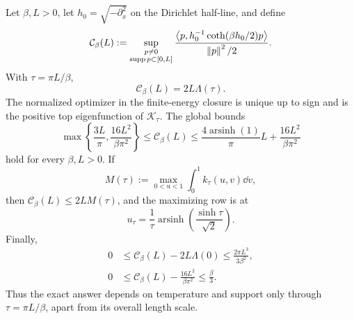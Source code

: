 \begin{theorem}
\label{thm:thermal-half-line}
Let $\beta,L>0$, let $h_0=\sqrt{-\partial_x^2}$ on the Dirichlet half-line,
and define
\begin{equation}
 \mathcal C_\beta(L)
 :=\sup_{\substack{p\neq0\\\operatorname{supp} p\subset[0,L]}}
 \frac{\left\langle p,h_0^{-1}\coth(\beta h_0/2)p\right\rangle}{\left\lVert p\right\rVert^2/2}.
 \label{eq:general-cost-definition}
\end{equation}
With $\tau=\pi L/\beta$,
\begin{equation}
 \boxed{\mathcal C_\beta(L)=2L\Lambda(\tau)}.
 \label{eq:general-sharp-cost}
\end{equation}
The normalized optimizer in the finite-energy closure is unique up to sign
and is the positive top eigenfunction of $\mathcal K_\tau$.  The global bounds
\begin{equation}
 \max\left\{\frac{3L}{\pi},\frac{16L^2}{\beta\pi^2}\right\}
 \leq\mathcal C_\beta(L)
 \leq\frac{4\operatorname{arsinh}(1)}\pi L
      +\frac{16L^2}{\beta\pi^2}
 \label{eq:general-explicit-bracket}
\end{equation}
hold for every $\beta,L>0$.  If
\begin{equation}
 M(\tau):=\max_{0<u<1}\int_0^1 k_\tau(u,v)\dd v,
\end{equation}
then $\mathcal C_\beta(L)\leq2LM(\tau)$, and the maximizing row is at
\begin{equation}
 u_\tau=\frac1\tau\operatorname{arsinh}
 \left(\frac{\sinh\tau}{\sqrt2}\right).
 \label{eq:thermal-row-maximizer}
\end{equation}
Finally,
\begin{align}
 0&\leq\mathcal C_\beta(L)-2L\Lambda(0)
 \leq\frac{2\pi L^3}{3\beta^2},
 \label{eq:general-small-support}\\
 0&\leq\mathcal C_\beta(L)-\frac{16L^2}{\beta\pi^2}
 \leq\frac\beta3.
 \label{eq:general-large-support}
\end{align}
Thus the exact answer depends on temperature and support only through
$\tau=\pi L/\beta$, apart from its overall length scale.
\end{theorem}

